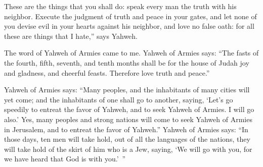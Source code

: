 {These are the things that you shall do: speak every man the truth with his neighbor. Execute the judgment of truth and peace in your gates,
and let none of you devise evil in your hearts against his neighbor, and love no false oath: for all these are things that I hate,” says Yahweh.
\par }{\PP {}The word of Yahweh of Armies came to me.
Yahweh of Armies says: “The fasts of the fourth, fifth, seventh, and tenth months shall be for the house of Judah joy and gladness, and cheerful feasts. Therefore love truth and peace.”
\par }{\PP {}Yahweh of Armies says: “Many peoples, and the inhabitants of many cities will yet come;
and the inhabitants of one shall go to another, saying, ‘Let’s go speedily to entreat the favor of Yahweh, and to seek Yahweh of Armies. I will go also.’
Yes, many peoples and strong nations will come to seek Yahweh of Armies in Jerusalem, and to entreat the favor of Yahweh.”
Yahweh of Armies says: “In those days, ten men will take hold, out of all the languages of the nations, they will take hold of the skirt of him who is a Jew, saying, ‘We will go with you, for we have heard that God is with you.’ ”

}
